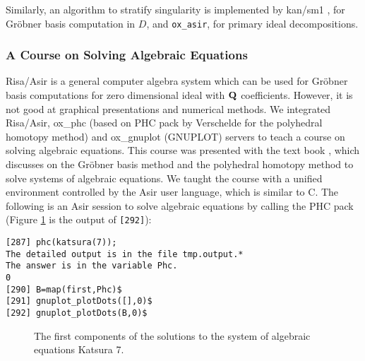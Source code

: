 Similarly, 
an algorithm to stratify singularity 
\cite{oaku-advance}
is implemented by
kan/sm1 \cite{kan}, for Gr\"obner basis computation in $D$, and
{\tt ox\_asir}, for primary ideal decompositions.

\subsubsection{A Course on Solving Algebraic Equations}

Risa/Asir \cite{asir} is a general computer algebra system
which can be used for Gr\"obner basis computations for zero dimensional ideal
with ${\bf Q}$ coefficients.
However, it is not good at graphical presentations and
numerical methods.
We integrated Risa/Asir, ox\_phc (based on PHC pack by Verschelde \cite{phc}
for the polyhedral homotopy method) and
ox\_gnuplot (GNUPLOT) servers
to teach a course on solving algebraic equations.
This course was presented with the text book \cite{CLO},
which discusses 
on the Gr\"obner basis method and the polyhedral homotopy method
to solve systems of algebraic equations.
We taught the course
with a unified environment
controlled by the Asir user language, which is similar to C.
The following is an Asir session to solve algebraic equations by calling
the PHC pack (Figure \ref{katsura} is the output of {\tt [292]}):
\begin{verbatim}
[287] phc(katsura(7));
The detailed output is in the file tmp.output.*
The answer is in the variable Phc.
0
[290] B=map(first,Phc)$
[291] gnuplot_plotDots([],0)$
[292] gnuplot_plotDots(B,0)$
\end{verbatim}

\begin{figure}[htbp]
\epsfxsize=8.5cm
\caption{The first components of the solutions to the system of algebraic equations Katsura 7.}
\label{katsura}
\end{figure}




